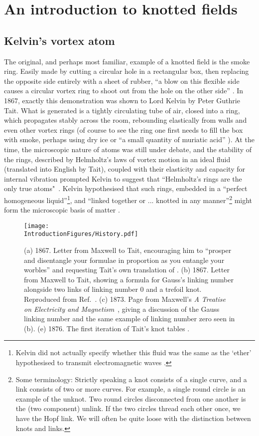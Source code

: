 \chapter{An introduction to knotted fields}
\section{Kelvin's vortex atom}
\label{sec:Kelvin}
The original, and perhaps most familiar, example of a knotted field is the smoke ring. Easily made by cutting a circular hole in a rectangular box, then replacing the opposite side entirely with a sheet of rubber, ``a blow on this flexible side causes a circular vortex ring to shoot out from the hole on the other side'' \citep{Kelvin}. In 1867, exactly this demonstration was shown to Lord Kelvin by Peter Guthrie Tait. What is generated is a tightly circulating tube of air, closed into a ring, which propagates stably across the room, rebounding elastically from walls and even other vortex rings (of course to see the ring one first needs to fill the box with smoke, perhaps using dry ice or ``a small quantity of muriatic acid'' \citep{Kelvin}). At the time, the microscopic nature of atoms was still under debate, and the stability of the rings, described by Helmholtz's laws of vortex motion in an ideal fluid \citep{Helmholtz} (translated into English by Tait), coupled with their elasticity and capacity for internal vibration \citep{KelvinAMS,KelvinMasters} prompted Kelvin to suggest that ``Helmholtz's rings are the only true atoms"~\citep{Kelvin}. Kelvin hypothesised that such rings, embedded in a ``perfect homogeneous liquid''\footnote{Kelvin did not actually specify whether this fluid was the same as the `ether' hypothesised to transmit electromagnetic waves \citep{KelvinMasters}.}, and ``linked together or ... knotted in any manner''\footnote{Some terminology: Strictly speaking a knot consists of a single curve, and a link consists of two or more curves. For example, a single round circle is an example of the unknot. Two round circles disconnected from one another is the (two component) unlink. If the two circles thread each other once, we have the Hopf link. We will often be quite loose with the distinction between knots and links.} might form the microscopic basis of matter \citep{Kelvin}.
\begin{figure}[htbp]
\centering
\texttt{[image: \\IntroductionFigures/History.pdf]}
\caption{(a) 1867. Letter from Maxwell to Tait, encouraging him to ``prosper and disentangle your formulae in proportion as you entangle your worbles'' and requesting Tait's own translation of \citep{Helmholtz}. (b) 1867. Letter from Maxwell to Tait, showing a formula for Gauss's linking number alongside two links of linking number 0 and a trefoil knot. Reproduced from Ref.~\citep{Ricca2011}. (c) 1873. Page from Maxwell's \emph{A Treatise on Electricity and Magnetism}~\citep{Maxwell2}, giving a discussion of the Gauss linking number and the same example of linking number zero seen in (b). (e) 1876. The first iteration of Tait's knot tables \citep{Tait1}.}
\label{fig:History}
\end{figure}

